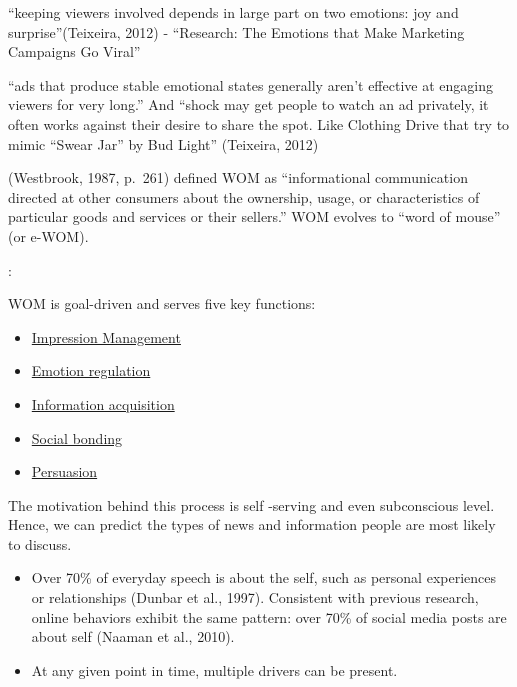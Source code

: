 \documentclass[
]{book}
\providecommand{\tightlist}{%
  \setlength{\itemsep}{0pt}\setlength{\parskip}{0pt}}
\begin{document}
``keeping viewers involved depends in large part on two emotions: joy and surprise''(Teixeira, 2012) - ``Research: The Emotions that Make Marketing Campaigns Go Viral''

``ads that produce stable emotional states generally aren't effective at engaging viewers for very long.'' And ``shock may get people to watch an ad privately, it often works against their desire to share the spot. Like Clothing Drive that try to mimic ``Swear Jar'' by Bud Light'' (Teixeira, 2012)

(Westbrook, 1987, p.~261) defined WOM as ``informational communication directed at other consumers about the ownership, usage, or characteristics of particular goods and services or their sellers.'' WOM evolves to ``word of mouse'' (or e-WOM).

\citep{Berger_2014}:

WOM is goal-driven and serves five key functions:

\begin{itemize}
\tightlist
\item
  \protect\hyperlink{impression-management}{Impression Management}\\
\item
  \protect\hyperlink{emotion-regulation}{Emotion regulation}\\
\item
  \protect\hyperlink{information-acquisition}{Information acquisition}\\
\item
  \protect\hyperlink{social-bonding}{Social bonding}\\
\item
  \protect\hyperlink{persuading-others}{Persuasion}
\end{itemize}

The motivation behind this process is self -serving and even subconscious level. Hence, we can predict the types of news and information people are most likely to discuss.

\begin{itemize}
\tightlist
\item
  Over 70\% of everyday speech is about the self, such as personal experiences or relationships (Dunbar et al., 1997). Consistent with previous research, online behaviors exhibit the same pattern: over 70\% of social media posts are about self (Naaman et al., 2010).
\item
  At any given point in time, multiple drivers can be present.
\end{itemize}
\end{document}
